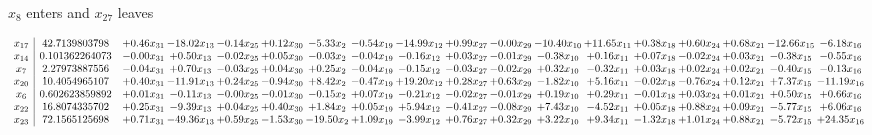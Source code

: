 \documentclass[9pt]{article}
\begin{document}
 $ x_{8} $ enters and $ x_{27} $ leaves 

 \[\begin{array}{c| c c@{\hskip 2pt} c@{\hskip 2pt} c@{\hskip 2pt} c@{\hskip 2pt} c@{\hskip 2pt} c@{\hskip 2pt} c@{\hskip 2pt} c@{\hskip 2pt} c@{\hskip 2pt} c@{\hskip 2pt} c@{\hskip 2pt} c@{\hskip 2pt} c@{\hskip 2pt} c@{\hskip 2pt} c@{\hskip 2pt} c@{\hskip 2pt} }
 x_{17}   &  42.7139803798 & +  0.46 x_{31} & -18.02 x_{13} & -0.14 x_{25} & +  0.12 x_{30} & -5.33 x_{2} & -0.54 x_{19} & -14.99 x_{12} & +  0.99 x_{27} & -0.00 x_{29} & -10.40 x_{10} & + 11.65 x_{11} & +  0.38 x_{18} & +  0.60 x_{24} & +  0.68 x_{21} & -12.66 x_{15} & -6.18 x_{16}\\
 x_{14}   &  0.101362264073 & -0.00 x_{31} & +  0.50 x_{13} & -0.02 x_{25} & +  0.05 x_{30} & -0.03 x_{2} & -0.04 x_{19} & -0.16 x_{12} & +  0.03 x_{27} & -0.01 x_{29} & -0.38 x_{10} & +  0.16 x_{11} & +  0.07 x_{18} & -0.02 x_{24} & +  0.03 x_{21} & -0.38 x_{15} & -0.55 x_{16}\\
 x_{7}   &  2.27973887556 & -0.04 x_{31} & +  0.70 x_{13} & -0.03 x_{25} & +  0.04 x_{30} & +  0.25 x_{2} & -0.04 x_{19} & -0.15 x_{12} & -0.03 x_{27} & -0.02 x_{29} & +  0.32 x_{10} & -0.32 x_{11} & +  0.03 x_{18} & +  0.02 x_{24} & +  0.02 x_{21} & -0.40 x_{15} & -0.13 x_{16}\\
 x_{20}   &  10.4054965107 & +  0.40 x_{31} & -11.91 x_{13} & +  0.24 x_{25} & -0.94 x_{30} & +  8.42 x_{2} & -0.47 x_{19} & + 19.20 x_{12} & +  0.28 x_{27} & +  0.63 x_{29} & -1.82 x_{10} & +  5.16 x_{11} & -0.02 x_{18} & -0.76 x_{24} & +  0.12 x_{21} & +  7.37 x_{15} & -11.19 x_{16}\\
 x_{6}   &  0.602623859892 & +  0.01 x_{31} & -0.11 x_{13} & -0.00 x_{25} & -0.01 x_{30} & -0.15 x_{2} & +  0.07 x_{19} & -0.21 x_{12} & -0.02 x_{27} & -0.01 x_{29} & +  0.19 x_{10} & +  0.29 x_{11} & -0.01 x_{18} & +  0.03 x_{24} & +  0.01 x_{21} & +  0.50 x_{15} & +  0.66 x_{16}\\
 x_{22}   &  16.8074335702 & +  0.25 x_{31} & -9.39 x_{13} & +  0.04 x_{25} & +  0.40 x_{30} & +  1.84 x_{2} & +  0.05 x_{19} & +  5.94 x_{12} & -0.41 x_{27} & -0.08 x_{29} & +  7.43 x_{10} & -4.52 x_{11} & +  0.05 x_{18} & +  0.88 x_{24} & +  0.09 x_{21} & -5.77 x_{15} & +  6.06 x_{16}\\
 x_{23}   &  72.1565125698 & +  0.71 x_{31} & -49.36 x_{13} & +  0.59 x_{25} & -1.53 x_{30} & -19.50 x_{2} & +  1.09 x_{19} & -3.99 x_{12} & +  0.76 x_{27} & +  0.32 x_{29} & +  3.22 x_{10} & +  9.34 x_{11} & -1.32 x_{18} & +  1.01 x_{24} & +  0.88 x_{21} & -5.72 x_{15} & + 24.35 x_{16}\\

\end{array}\]
\end{document}
